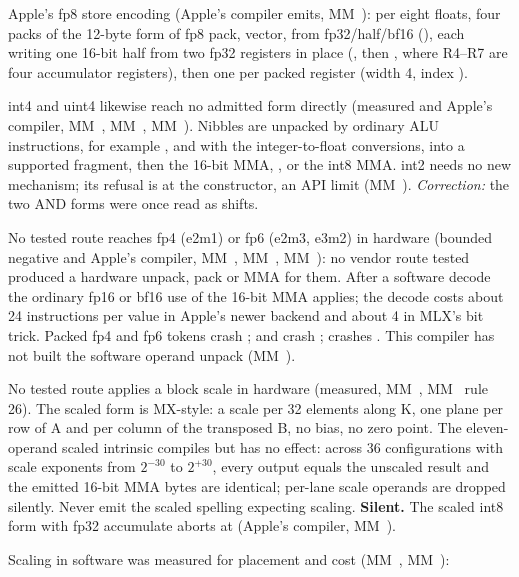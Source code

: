 Apple's fp8 store encoding (Apple's compiler emits, MM~): per eight floats, four packs of the 12-byte form of
fp8 pack, vector, from fp32/half/bf16 (), each
writing one 16-bit half from two fp32 registers in place (, then , where R4–R7 are four
accumulator registers), then one  per packed register (width 4, index ).

int4 and uint4 likewise reach no admitted form directly (measured and Apple's compiler, MM~, MM~,
MM~). Nibbles
are unpacked by ordinary ALU instructions, for example ,  and
 with the integer-to-float conversions, into a supported fragment, then the 16-bit MMA,
, or the int8 MMA. int2 needs no new mechanism; its refusal is at the
 constructor, an API limit (MM~). \emph{Correction:} the two AND forms were once read as shifts.

No tested route reaches fp4 (e2m1) or fp6 (e2m3, e3m2) in hardware (bounded negative and Apple's compiler, MM~, MM~,
MM~): no vendor route tested produced a hardware unpack, pack or MMA for them. After a software decode the ordinary fp16 or
bf16 use of the 16-bit MMA applies; the decode costs about 24 instructions per value in Apple's newer backend and about 4 in MLX's bit
trick. Packed fp4 and fp6 tokens crash ;  and  crash ;
 crashes . This compiler has not built the software operand unpack (MM~).

No tested route applies a block scale in hardware (measured, MM~, MM~ rule 26). The scaled  form is MX-style: a 
scale per 32 elements along K, one plane per row of A and per column of the transposed B, no bias, no zero point. The
eleven-operand scaled intrinsic compiles but has no effect: across 36 configurations with scale exponents from $2^{-30}$
to $2^{+30}$, every output equals the unscaled result and the emitted 16-bit MMA bytes are identical; per-lane scale operands
are dropped silently. Never emit the scaled spelling expecting scaling. \textbf{Silent.} The scaled int8 form with fp32
accumulate aborts at  (Apple's compiler, MM~).

Scaling in software was measured for placement and cost (MM~, MM~):

